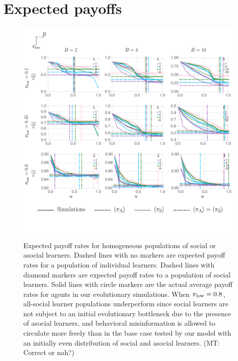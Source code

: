 \documentclass[letterpaper,11.5pt]{scrartcl}
\newcommand{\mt}[1]{{\textcolor{myorange} {({\tiny MT:} #1)}}}
\begin{document}
\section{Expected payoffs}
\begin{figure}
  \caption{Expected payoff rates for homogeneous populations of social or asocial learners. Dashed lines with no markers are expected payoff rates for a population of individual learners. Dashed lines with diamond markers are expected payoff rates to a population of social learners. Solid lines with circle markers are the actual average payoff rates for agents in our evolutionary simulations.  When $\pi_{\mathrm{low}} = 0.8$, all-social learner populations underperform
    since social learners are not subject to an initial evolutionary bottleneck
    due to the presence of asocial learners, and behavioral misinformation
    is allowed to circulate more freely than in the base case tested by 
    our model with an initially even distribution of social and asocial learners.
    \mt{Correct or nah?}
}
  \label{fig:payoffs}
  \centering
    \includegraphics[width=\textwidth]{Figures/meanNetPayoffs.pdf}
\end{figure}

\clearpage
\end{document}
